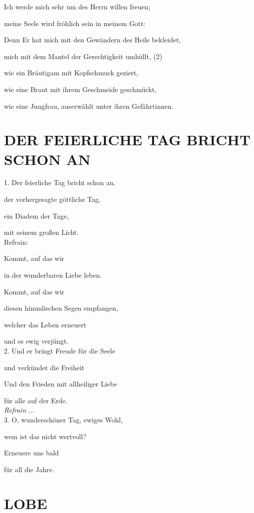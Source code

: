 \documentclass[11pt,a5paper,twoside]{article}
\begin{document}
Ich werde mich sehr um des Herrn willen freuen;

meine Seele wird fröhlich sein in meinem
Gott:

Denn Er hat mich mit den Gewändern
des Heils bekleidet,

mich mit dem Mantel der Gerechtigkeit
umhüllt, (2)

wie ein Bräutigam mit Kopfschmuck
geziert,

wie eine Braut mit ihrem Geschmeide
geschmückt,

wie eine Jungfrau, auserwählt unter
ihren Gefährtinnen.


\section[Der feierliche Tag bricht schon an]{DER FEIERLICHE TAG BRICHT SCHON AN}

1. Der feierliche Tag bricht schon an, 

der vorhergesagte göttliche Tag,

ein Diadem der Tage,

mit seinem großen Licht.\\

Refrain:

Kommt, auf das wir 

in der wunderbaren Liebe leben.

Kommt, auf das wir 

diesen himmlischen Segen empfangen,

welcher das Leben erneuert

 und es ewig verjüngt.\\

2. Und er bringt Freude für die Seele

und verkündet die Freiheit

Und den Frieden mit allheiliger Liebe

für alle auf der Erde.\\


\textit{Refrain ...}\\

3. O, wunderschöner Tag, ewiges Wohl,
 
wem ist das nicht wertvoll?

Erneuere uns bald

für all die Jahre.\\



\section[Lobe]{LOBE}
\end{document}
